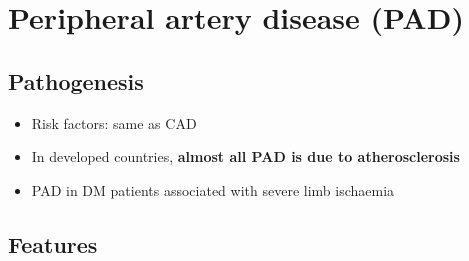 \documentclass[
  12pt,
]{memoir}
\providecommand{\tightlist}{%
  \setlength{\itemsep}{0pt}\setlength{\parskip}{0pt}}
\begin{document}
\hypertarget{peripheral-artery-disease-pad}{%
\section{Peripheral artery disease
(PAD)}\label{peripheral-artery-disease-pad}}

\hypertarget{pathogenesis-1}{%
\subsection{Pathogenesis}\label{pathogenesis-1}}

\begin{itemize}
\tightlist
\item
  Risk factors: same as CAD
\item
  In developed countries, \textbf{almost all PAD is due to
  atherosclerosis}
\item
  PAD in DM patients associated with severe limb ischaemia
\end{itemize}

\hypertarget{features-2}{%
\subsection{Features}\label{features-2}}
\end{document}

